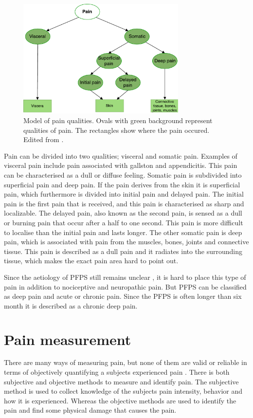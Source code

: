 \begin{figure} [H]
\centering
\includegraphics[width=0.75\textwidth]{figures/painpic}
\caption{Model of pain qualities. Ovals with green background  represent qualities of pain. The rectangles show where the pain occured. Edited from \citep{Schmidt2013}.}
\label{fig:qualities}
\end{figure}

\noindent
Pain can be divided into two qualities; visceral and somatic pain. Examples of visceral pain include pain associated with gallston and appendicitis. This pain can be characterised as a dull or diffuse feeling. Somatic pain is subdivided into superficial pain and deep pain. If the pain derives from the skin it is superficial pain, which furthermore is divided into initial pain and delayed pain. The initial pain is the first pain that is received, and this pain is characterised as sharp and localizable. The delayed pain, also known as the second pain, is sensed as a dull or burning pain that occur after a half to one second. This pain is more difficult to localise than the initial pain and lasts longer.\citep{Schmidt1989, Schmidt2013}
The other somatic pain is deep pain, which is associated with pain from the muscles, bones, joints and connective tissue. This pain is described as a dull pain and it radiates into the surrounding tissue, which makes the exact pain area hard to point out.\citep{Schmidt1989, Schmidt2013}


\noindent
Since the aetiology of PFPS still remains unclear \citep{Smith2015}, it is hard to place this type of pain in addition to nociceptive and neuropathic pain. But PFPS can be classified as deep pain and acute or chronic pain. Since the PFPS is often longer than six month it is described as a chronic deep pain. 


\section{Pain measurement}
There are many ways of measuring pain, but none of them are valid or reliable in terms of objectively quantifying a subjects experienced pain \citep{Younger2009}. There is both subjective and objective methods to measure and identify pain. The subjective method is used to collect knowledge of the subjects pain intensity, behavior and how it is experienced. Whereas the objective methods are used to identify the pain and find some physical damage that causes the pain. 

